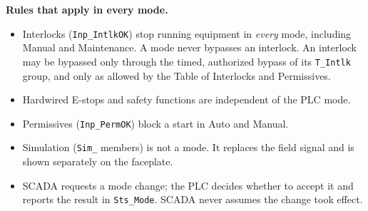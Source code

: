 \textbf{Rules that apply in every mode.}
\begin{itemize}[itemsep=1pt]
  \item Interlocks (\texttt{Inp\_IntlkOK}) stop running equipment in \emph{every} mode, including Manual and Maintenance. A mode never bypasses an interlock. An interlock may be bypassed only through the timed, authorized bypass of its \texttt{T\_Intlk} group, and only as allowed by the Table of Interlocks and Permissives.
  \item Hardwired E-stops and safety functions are independent of the PLC mode.
  \item Permissives (\texttt{Inp\_PermOK}) block a start in Auto and Manual.
  \item Simulation (\texttt{Sim\_} members) is not a mode. It replaces the field signal and is shown separately on the faceplate.
  \item SCADA requests a mode change; the PLC decides whether to accept it and reports the result in \texttt{Sts\_Mode}. SCADA never assumes the change took effect.
\end{itemize}

